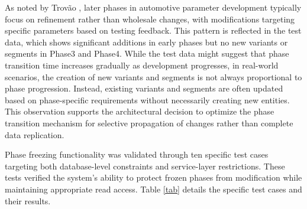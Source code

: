 As noted by Trovão \cite{trovao2024evolution}, later phases in automotive parameter development typically focus on refinement rather than wholesale changes, with modifications targeting specific parameters based on testing feedback. This pattern is reflected in the test data, which shows significant additions in early phases but no new variants or segments in Phase3 and Phase4. While the test data might suggest that phase transition time increases gradually as development progresses, in real-world scenarios, the creation of new variants and segments is not always proportional to phase progression. Instead, existing variants and segments are often updated based on phase-specific requirements without necessarily creating new entities. This observation supports the architectural decision to optimize the phase transition mechanism for selective propagation of changes rather than complete data replication.

Phase freezing functionality was validated through ten specific test cases targeting both database-level constraints and service-layer restrictions. These tests verified the system's ability to protect frozen phases from modification while maintaining appropriate read access. Table \ref{tab} details the specific test cases and their results.

